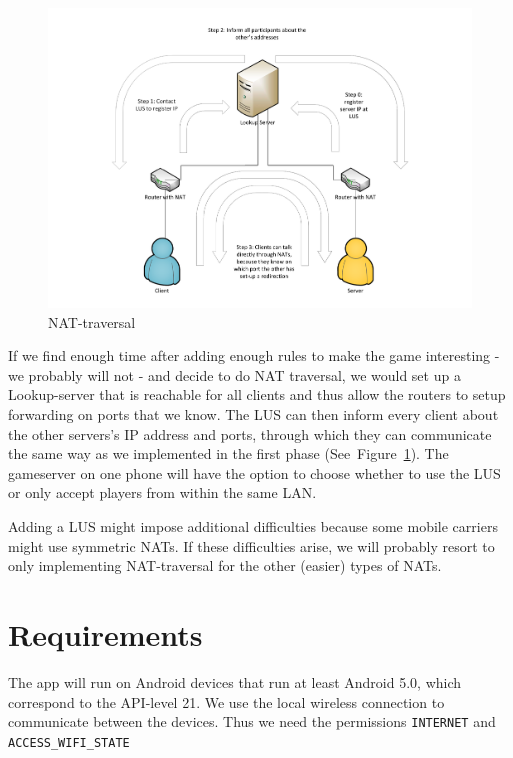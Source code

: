\documentclass{sig-alternate}
\newcommand{\lfig}[1]{\label{fig:#1}}
\newcommand{\rfig}[1]{Figure~\ref{fig:#1}}
\begin{document}
\begin{figure}[!htbp]
	\centering
    \includegraphics[width=\columnwidth]{NATholepunching.pdf}
    \vspace{-5mm} %
	\caption{NAT-traversal}
	\lfig{nat}
\end{figure}

If we find enough time after adding enough rules to make the game interesting - we probably will not - and decide to do NAT traversal, we would set up a Lookup-server that is reachable for all clients and thus allow the routers to setup forwarding on ports that we know. The LUS can then inform every client about the other servers's IP address and ports, through which they can communicate the same way as we implemented in the first phase (See~\rfig{nat}). The gameserver on one phone will have the option to choose whether to use the LUS or only accept players from within the same LAN.

Adding a LUS might impose additional difficulties because some mobile carriers might use symmetric NATs. If these difficulties arise, we will probably resort to only implementing NAT-traversal for the other (easier) types of NATs.

\section{Requirements}
The app will run on Android devices that run at least Android 5.0, which correspond to the API-level 21. We use the local wireless connection to communicate between the devices. Thus we need the permissions \verb|INTERNET| and \verb|ACCESS_WIFI_STATE|
\end{document}
